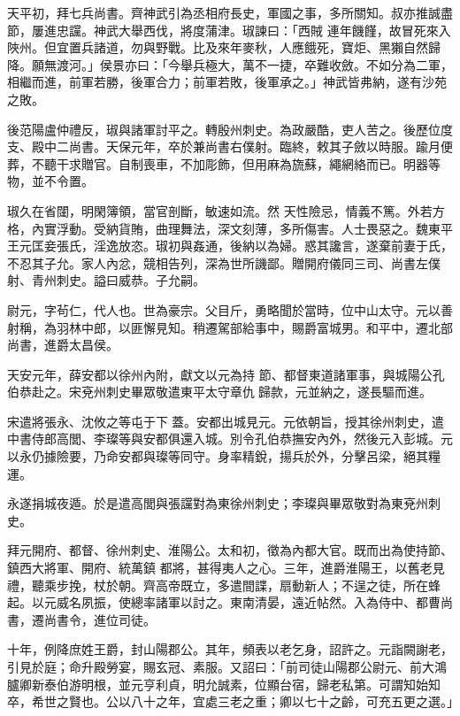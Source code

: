 \begin{pinyinscope}
 天平初，拜七兵尚書。齊神武引為丞相府長史，軍國之事，多所關知。叔亦推誠盡節，屢進忠讜。神武大舉西伐，將度蒲津。琡諫曰：「西賊
 連年饑饉，故冒死來入陜州。但宜置兵諸道，勿與野戰。比及來年麥秋，人應餓死，寶炬、黑獺自然歸降。願無渡河。」侯景亦曰：「今舉兵極大，萬不一捷，卒難收斂。不如分為二軍，相繼而進，前軍若勝，後軍合力；前軍若敗，後軍承之。」神武皆弗納，遂有沙苑之敗。



 後范陽盧仲禮反，琡與諸軍討平之。轉殷州刺史。為政嚴酷，吏人苦之。後歷位度支、殿中二尚書。天保元年，卒於兼尚書右僕射。臨終，敕其子斂以時服。踰月便葬，不聽干求贈官。自制喪車，不加彫飾，但用麻為旒蘇，繩網絡而已。明器等物，並不令置。



 琡久在省闥，明閑簿領，當官剖斷，敏速如流。然
 天性險忌，情義不篤。外若方格，內實浮動。受納貨賄，曲理舞法，深文刻薄，多所傷害。人士畏惡之。魏東平王元匡妾張氏，淫逸放恣。琡初與姦通，後納以為婦。惑其讒言，遂棄前妻于氏，不忍其子允。家人內忿，競相告列，深為世所譏鄙。贈開府儀同三司、尚書左僕射、青州刺史。謚曰威恭。子允嗣。



 尉元，字茍仁，代人也。世為豪宗。父目斤，勇略聞於當時，位中山太守。元以善射稱，為羽林中郎，以匪懈見知。稍遷駕部給事中，賜爵富城男。和平中，遷北部尚書，進爵太昌侯。



 天安元年，薛安都以徐州內附，獻文以元為持
 節、都督東道諸軍事，與城陽公孔伯恭赴之。宋兗州刺史畢眾敬遣東平太守章仇歸款，元並納之，遂長驅而進。



 宋遣將張永、沈攸之等屯于下蓋。安都出城見元。元依朝旨，授其徐州刺史，遣中書侍郎高閭、李璨等與安都俱還入城。別令孔伯恭撫安內外，然後元入彭城。元以永仍據險要，乃命安都與璨等同守。身率精銳，揚兵於外，分擊呂梁，絕其糧運。



 永遂捐城夜遁。於是遣高閭與張讜對為東徐州刺史；李璨與畢眾敬對為東兗州刺史。



 拜元開府、都督、徐州刺史、淮陽公。太和初，徵為內都大官。既而出為使持節、鎮西大將軍、開府、統萬鎮
 都將，甚得夷人之心。三年，進爵淮陽王，以舊老見禮，聽乘步挽，杖於朝。齊高帝既立，多遣間諜，扇動新人；不逞之徒，所在蜂起。以元威名夙振，使總率諸軍以討之。東南清晏，遠近帖然。入為侍中、都曹尚書，遷尚書令，進位司徒。



 十年，例降庶姓王爵，封山陽郡公。其年，頻表以老乞身，詔許之。元詣闕謝老，引見於庭；命升殿勞宴，賜玄冠、素服。又詔曰：「前司徒山陽郡公尉元、前大鴻臚卿新泰伯游明根，並元亨利貞，明允誠素，位顯台宿，歸老私第。可謂知始知卒，希世之賢也。公以八十之年，宜處三老之重；卿以七十之齡，可充五更之選。」




\end{pinyinscope}
